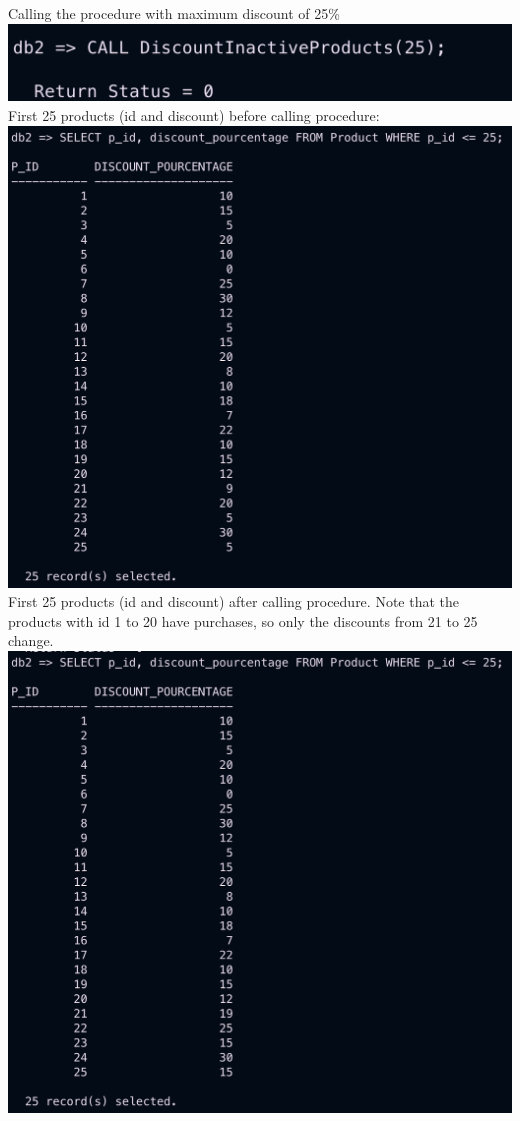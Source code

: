 \documentclass[a4paper,11pt]{article}
\begin{document}
Calling the procedure with maximum discount of 25\%\\
\includegraphics*[width=\textwidth]{images/call_to_procedure.png}
First 25 products (id and discount) before calling procedure:\\
\includegraphics*[width=\textwidth]{images/products_before.png}
First 25 products (id and discount) after calling procedure. Note that the products with id 1 to 20 have purchases, so only the discounts from 21 to 25 change. \\
\includegraphics*[width=\textwidth]{images/products_after.png}
\end{document}
